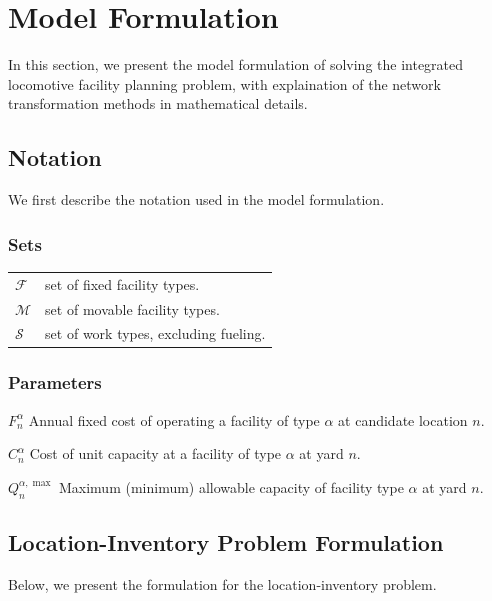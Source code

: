 \section{Model Formulation}\label{sec:locomotive:formulation}

In this section, we present the model formulation of solving the integrated locomotive facility planning problem, with explaination of the network transformation methods in mathematical details.


\subsection{Notation}\label{sec:locomotive:notation}
We first describe the notation used in the model formulation.

\subsubsection{Sets}
\begin{tabular}{ll}  %
    $\mathcal{F}$            & set of fixed facility types.  \\
    $\mathcal{M}$            & set of movable facility types.  \\
    $\mathcal{S}$            & set of work types, excluding fueling.  \\
\end{tabular}

\subsubsection{Parameters} 
\begin{notation}   %
  \item[$F_{n}^{\alpha}$] Annual fixed cost of operating a facility of type $\alpha$ at candidate location $n$.
  \item[$C_{n}^{\alpha}$] Cost of unit capacity at a facility of type $\alpha$ at yard $n$.
  \item[$Q_{n}^{\alpha,\max}$] Maximum (minimum) allowable capacity of facility type $\alpha$ at yard $n$.
\end{notation}

\subsection{Location-Inventory Problem Formulation}\label{sec:locomotive:location-inventory}
Below, we present the formulation for the location-inventory problem.

